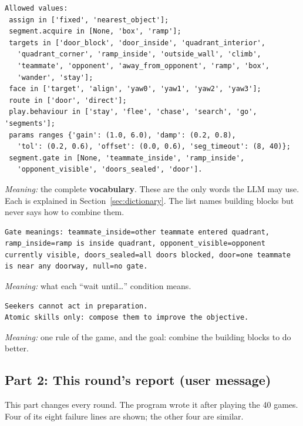 \documentclass[11pt]{article}
\begin{document}
{\small
\begin{verbatim}
Allowed values:
 assign in ['fixed', 'nearest_object'];
 segment.acquire in [None, 'box', 'ramp'];
 targets in ['door_block', 'door_inside', 'quadrant_interior',
   'quadrant_corner', 'ramp_inside', 'outside_wall', 'climb',
   'teammate', 'opponent', 'away_from_opponent', 'ramp', 'box',
   'wander', 'stay'];
 face in ['target', 'align', 'yaw0', 'yaw1', 'yaw2', 'yaw3'];
 route in ['door', 'direct'];
 play.behaviour in ['stay', 'flee', 'chase', 'search', 'go', 'segments'];
 params ranges {'gain': (1.0, 6.0), 'damp': (0.2, 0.8),
   'tol': (0.2, 0.6), 'offset': (0.0, 0.6), 'seg_timeout': (8, 40)};
 segment.gate in [None, 'teammate_inside', 'ramp_inside',
   'opponent_visible', 'doors_sealed', 'door'].
\end{verbatim}
}
\noindent\textit{Meaning:} the complete \textbf{vocabulary}. These are the only
words the LLM may use. Each is explained in Section~\ref{sec:dictionary}. The list
names building blocks but never says how to combine them.

{\small
\begin{verbatim}
Gate meanings: teammate_inside=other teammate entered quadrant,
ramp_inside=ramp is inside quadrant, opponent_visible=opponent
currently visible, doors_sealed=all doors blocked, door=one teammate
is near any doorway, null=no gate.
\end{verbatim}
}
\noindent\textit{Meaning:} what each ``wait until\ldots'' condition means.

{\small
\begin{verbatim}
Seekers cannot act in preparation.
Atomic skills only: compose them to improve the objective.
\end{verbatim}
}
\noindent\textit{Meaning:} one rule of the game, and the goal: combine the
building blocks to do better.

\subsection{Part 2: This round's report (user message)}

This part changes every round. The program wrote it after playing the 40 games.
Four of its eight failure lines are shown; the other four are similar.
\end{document}
